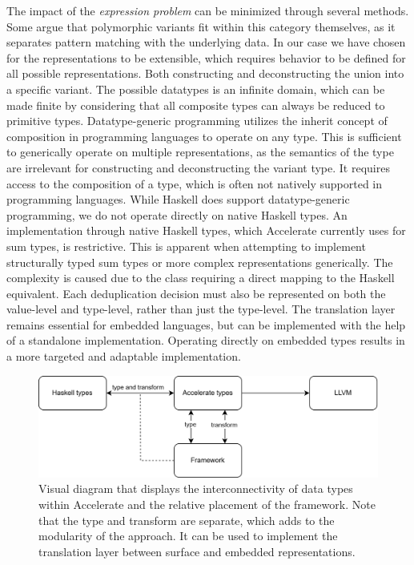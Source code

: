 \documentclass{article}
\newcommand{\type}[1]{\smash{\colorbox{codegray}{\texttt{#1}}}}
\begin{document}
The impact of the {\it expression problem} can be minimized through several methods. 
Some argue that polymorphic variants fit within this category themselves, as it separates pattern matching with the underlying data\cite{polymorphic-variants-expression-problem}.
In our case we have chosen for the representations to be extensible, which requires behavior to be defined for all possible representations.
Both constructing and deconstructing the union into a specific variant.
The possible datatypes is an infinite domain, which can be made finite by considering that all composite types can always be reduced to primitive types.
Datatype-generic programming utilizes the inherit concept of composition in programming languages to operate on any type.
This is sufficient to generically operate on multiple representations, as the semantics of the type are irrelevant for constructing and deconstructing the variant type.
It requires access to the composition of a type, which is often not natively supported in programming languages.
While Haskell does support datatype-generic programming, we do not operate directly on native Haskell types.
An implementation through native Haskell types, which Accelerate currently uses for sum types, is restrictive.
This is apparent when attempting to implement structurally typed sum types or more complex representations generically\cite{accelerate-sum-types}.
The complexity is caused due to the \type{Elt} class requiring a direct mapping to the Haskell equivalent. 
Each deduplication decision must also be represented on both the value-level and type-level, rather than just the type-level.
The translation layer remains essential for embedded languages, but can be implemented with the help of a standalone implementation.
Operating directly on embedded types results in a more targeted and adaptable implementation. 

\begin{figure}[ht]
    \centering
    \includegraphics[scale=0.15]{framework.png}
    \caption
    {
        Visual diagram that displays the interconnectivity of data types within Accelerate and the relative placement of the framework.
        Note that the type and transform are separate, which adds to the modularity of the approach. 
        It can be used to implement the translation layer between surface and embedded representations.
    }
\end{figure}
\end{document}
